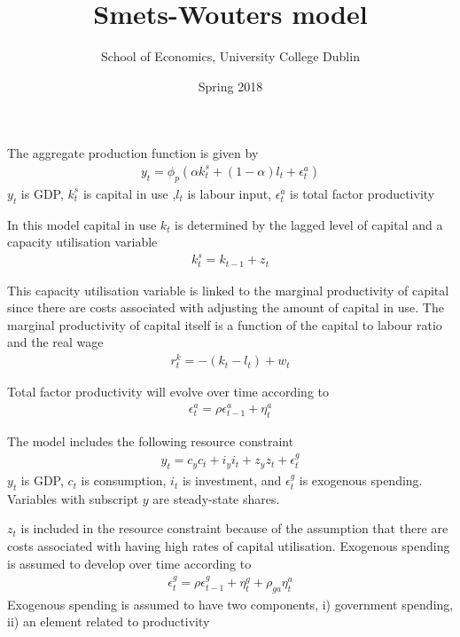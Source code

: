 \documentclass{beamer}
\title{Smets-Wouters model}
\author{School of Economics, University College Dublin}
\date{Spring 2018}
\begin{document}
\begin{frame}
 \titlepage
\end{frame}

\begin{frame}
  The aggregate production function is given by
\begin{align*}
  y_t=\phi_p(\alpha k_t^s + (1-\alpha)l_t + \epsilon_t^a)
\end{align*}
$y_t$ is GDP, $k^s_t$ is capital in use ,$l_t$ is labour input, $\epsilon_t^a$ is total factor productivity

In this model capital in use $k_t$ is determined by the lagged level of capital and a capacity utilisation variable
\begin{align*}
  k_t^s = k_{t-1} + z_t
\end{align*}
\end{frame}

\begin{frame}
  This capacity utilisation variable is linked to the marginal productivity of capital since there are costs associated with adjusting the amount of capital in use. 
The marginal productivity of capital itself is a function of the capital to labour ratio  and the real wage
\begin{align*}
  r_t^k = -(k_t-l_t) + w_t
\end{align*}

Total factor productivity will evolve over time according to 
\begin{align*}
  \epsilon_t^a = \rho \epsilon_{t-1}^a + \eta_t^a
\end{align*}
\end{frame}

\begin{frame}
  The model includes the following resource constraint
\begin{align*}
  y_t = c_y c_t + i_y i_t + z_y z_t + \epsilon_t^g
\end{align*}
$y_t$ is GDP, $c_t$ is consumption, $i_t$ is investment, and $\epsilon_t^g$ is exogenous spending. Variables with subscript $y$ are steady-state shares.
\end{frame}

\begin{frame}
  $z_t$ is included in the resource constraint because of the assumption that there are costs associated with having high rates of capital utilisation. 
Exogenous spending is assumed to develop over time according to
\begin{align*}
  \epsilon_t^g = \rho\epsilon_{t-1}^g + \eta_t^g + \rho_{ga}\eta_t^a
\end{align*}
Exogenous spending is assumed to have two components, i) government spending, ii) an element related to productivity
\end{frame}
\end{document}
